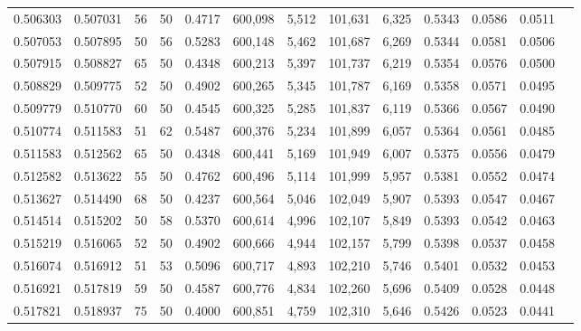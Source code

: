 \begin{tabular}{rrrrrrrrrrrrr}
0.506303 & 0.507031 &    56 &  50 &                                     0.4717 & 600,098 &   5,512 & 101,631 &   6,325 & 0.5343 & 0.0586 & 0.0511 \\
0.507053 & 0.507895 &    50 &  56 &                                     0.5283 & 600,148 &   5,462 & 101,687 &   6,269 & 0.5344 & 0.0581 & 0.0506 \\
0.507915 & 0.508827 &    65 &  50 &                                     0.4348 & 600,213 &   5,397 & 101,737 &   6,219 & 0.5354 & 0.0576 & 0.0500 \\
0.508829 & 0.509775 &    52 &  50 &                                     0.4902 & 600,265 &   5,345 & 101,787 &   6,169 & 0.5358 & 0.0571 & 0.0495 \\
0.509779 & 0.510770 &    60 &  50 &                                     0.4545 & 600,325 &   5,285 & 101,837 &   6,119 & 0.5366 & 0.0567 & 0.0490 \\
0.510774 & 0.511583 &    51 &  62 &                                     0.5487 & 600,376 &   5,234 & 101,899 &   6,057 & 0.5364 & 0.0561 & 0.0485 \\
0.511583 & 0.512562 &    65 &  50 &                                     0.4348 & 600,441 &   5,169 & 101,949 &   6,007 & 0.5375 & 0.0556 & 0.0479 \\
0.512582 & 0.513622 &    55 &  50 &                                     0.4762 & 600,496 &   5,114 & 101,999 &   5,957 & 0.5381 & 0.0552 & 0.0474 \\
0.513627 & 0.514490 &    68 &  50 &                                     0.4237 & 600,564 &   5,046 & 102,049 &   5,907 & 0.5393 & 0.0547 & 0.0467 \\
0.514514 & 0.515202 &    50 &  58 &                                     0.5370 & 600,614 &   4,996 & 102,107 &   5,849 & 0.5393 & 0.0542 & 0.0463 \\
0.515219 & 0.516065 &    52 &  50 &                                     0.4902 & 600,666 &   4,944 & 102,157 &   5,799 & 0.5398 & 0.0537 & 0.0458 \\
0.516074 & 0.516912 &    51 &  53 &                                     0.5096 & 600,717 &   4,893 & 102,210 &   5,746 & 0.5401 & 0.0532 & 0.0453 \\
0.516921 & 0.517819 &    59 &  50 &                                     0.4587 & 600,776 &   4,834 & 102,260 &   5,696 & 0.5409 & 0.0528 & 0.0448 \\
0.517821 & 0.518937 &    75 &  50 &                                     0.4000 & 600,851 &   4,759 & 102,310 &   5,646 & 0.5426 & 0.0523 & 0.0441 \\

\end{tabular}
